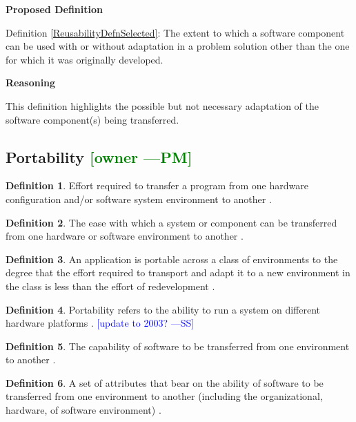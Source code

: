 \documentclass[letterpaper, cleveref]{lipics-v2019}
\newcommand{\authornote}[3]{\textcolor{#1}{[#3 ---#2]}}
\newcommand{\authornote}[3]{}
\newcommand{\wss}[1]{\authornote{blue}{SS}{#1}} %
\newcommand{\pmi}[1]{\authornote{green}{PM}{#1}} %
\theoremstyle{definition}
\newtheorem{defn}{Definition}
\begin{document}
\noindent \textbf{Proposed Definition}

Definition \ref{ReusabilityDefnSelected}: The extent to which a software
component can be used with or without adaptation in a problem solution other
than the one for which it was originally developed.

\noindent \textbf{Reasoning}

This definition highlights the possible but not necessary adaptation of the
software component(s) being transferred.


\subsection{{Portability} \pmi{owner}}

\begin{defn} \label{PortabilityDefnSelected}
  Effort required to transfer a program from one hardware configuration
  and/or software system environment to another \citep{McCallEtAl1977}.
\end{defn}

\begin{defn}
  The ease with which a system or component can be transferred from one
  hardware or software environment to another \citep{IEEEStdGlossarySET1990}.
\end{defn}

\begin{defn}
  An application is portable across a class of environments to the degree
  that the effort required to transport and adapt it to a new environment in
  the class is less than the effort of redevelopment
  \citep{mooney1990strategies}.
\end{defn}

\begin{defn}
  Portability refers to the ability to run a system on different hardware
  platforms \citep{ghezzi1991fundamentals}.  \wss{update to 2003?}
\end{defn}

\begin{defn}
  The capability of software to be transferred from one environment to
  another \cite{ISO9126}. %
\end{defn}

\begin{defn}
  A set of attributes that bear on the ability of software to be transferred
  from one environment to another (including the organizational, hardware, of
  software environment) \citep{pfleeger2006software}.
\end{defn}
\end{document}
